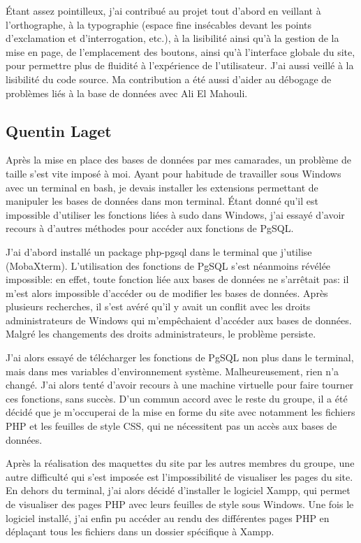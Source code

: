 \documentclass{article}
\begin{document}
Étant assez pointilleux, j'ai contribué au projet tout d'abord en veillant à l'orthographe, à la typographie (espace fine insécables devant les points d'exclamation et d'interrogation, etc.), à la lisibilité ainsi qu'à la gestion de la mise en page, de l'emplacement des boutons, ainsi qu'à l'interface globale du site, pour permettre plus de fluidité à l'expérience de l'utilisateur. J'ai aussi veillé à la lisibilité du code source. Ma contribution a été aussi d'aider au débogage de problèmes liés à la base de données avec Ali El Mahouli.


\subsection*{Quentin Laget}

Après la mise en place des bases de données par mes camarades, un problème de taille s'est vite imposé à moi. Ayant pour habitude de travailler sous Windows avec un terminal en bash, je devais installer les extensions permettant de manipuler les bases de données dans mon terminal. Étant donné qu'il est impossible d'utiliser les fonctions liées à sudo dans Windows, j'ai essayé d'avoir recours à d'autres méthodes pour accéder aux fonctions de PgSQL.

J'ai d'abord installé un package php-pgsql dans le terminal que j'utilise (MobaXterm). L'utilisation des fonctions de PgSQL s'est néanmoins révélée impossible: en effet, toute fonction liée aux bases de données ne s'arrêtait pas: il m'est alors impossible d'accéder ou de modifier les bases de données.  Après plusieurs recherches, il s'est avéré qu'il y avait un conflit avec les droits administrateurs de Windows qui m'empêchaient d'accéder aux bases de données. Malgré les changements des droits administrateurs, le problème persiste.

J'ai alors essayé de télécharger les fonctions de PgSQL non plus dans le terminal, mais dans mes variables d'environnement système. Malheureusement, rien n'a changé. J'ai alors tenté d'avoir recours à une machine virtuelle pour faire tourner ces fonctions, sans succès. D'un commun accord avec le reste du groupe, il a été décidé que je m'occuperai de la mise en forme du site avec notamment les fichiers PHP et les feuilles de style CSS, qui ne nécessitent pas un accès aux bases de données.

Après la réalisation des maquettes du site par les autres membres du groupe, une autre difficulté qui s'est imposée est l'impossibilité de visualiser les pages du site. En dehors du terminal, j'ai alors décidé d'installer le logiciel Xampp, qui permet de visualiser des pages PHP avec leurs feuilles de style sous Windows. Une fois le logiciel installé, j'ai enfin pu accéder au rendu des différentes pages PHP en déplaçant tous les fichiers dans un dossier spécifique à Xampp.
\end{document}
